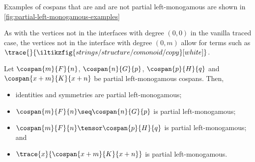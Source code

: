 \begin{example}
    Examples of cospans that are and are not partial left-monogamous are shown
    in \cref{fig:partial-left-monogamous-examples}
\end{example}

\begin{remark}
    As with the vertices not in the interfaces with degree \((0, 0)\) in the
    vanilla traced case, the vertices not in the interface with degree
    \((0, m)\) allow for terms such as \(
        \trace{}{\iltikzfig{strings/structure/comonoid/copy}[white]}
    \).
\end{remark}

\begin{lemma}
    \label{lem:partial-monogamous-ops}
    Let \(\cospan{m}{F}{n}\), \(\cospan{n}{G}{p}\), \(\cospan{p}{H}{q}\) and
    \(\cospan{x+m}{K}{x+n}\) be partial left-monogamous cospans.
    Then,
    \begin{itemize}
        \item identities and symmetries are partial left-monogamous;
        \item \(\cospan{m}{F}{n} \seq \cospan{n}{G}{p}\) is partial
                left-monogamous;
        \item \(\cospan{m}{F}{n} \tensor \cospan{p}{H}{q}\) is partial
                left-monogamous; and
        \item \(\trace{x}{\cospan{x+m}{K}{x+n}}\) is partial left-monogamous.
    \end{itemize}
\end{lemma}
